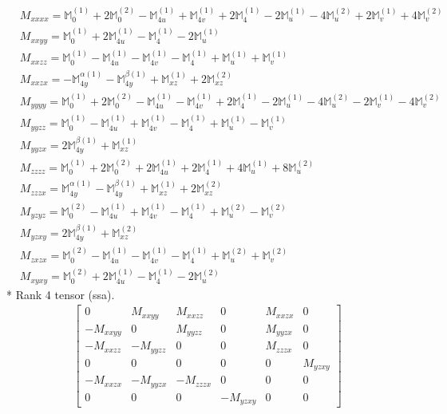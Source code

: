 \documentclass[fleqn,8pt,landscape]{jsarticle}
\begin{document}
\begin{align*}
& M_{xxxx} = \mathbb{M}_{0}^{(1)} + 2 \mathbb{M}_{0}^{(2)} - \mathbb{M}_{4u}^{(1)} + \mathbb{M}_{4v}^{(1)} + 2 \mathbb{M}_{4}^{(1)} - 2 \mathbb{M}_{u}^{(1)} - 4 \mathbb{M}_{u}^{(2)} + 2 \mathbb{M}_{v}^{(1)} + 4 \mathbb{M}_{v}^{(2)} \\
& M_{xxyy} = \mathbb{M}_{0}^{(1)} + 2 \mathbb{M}_{4u}^{(1)} - \mathbb{M}_{4}^{(1)} - 2 \mathbb{M}_{u}^{(1)} \\
& M_{xxzz} = \mathbb{M}_{0}^{(1)} - \mathbb{M}_{4u}^{(1)} - \mathbb{M}_{4v}^{(1)} - \mathbb{M}_{4}^{(1)} + \mathbb{M}_{u}^{(1)} + \mathbb{M}_{v}^{(1)} \\
& M_{xxzx} = - \mathbb{M}_{4y}^{\alpha(1)} - \mathbb{M}_{4y}^{\beta(1)} + \mathbb{M}_{xz}^{(1)} + 2 \mathbb{M}_{xz}^{(2)} \\
& M_{yyyy} = \mathbb{M}_{0}^{(1)} + 2 \mathbb{M}_{0}^{(2)} - \mathbb{M}_{4u}^{(1)} - \mathbb{M}_{4v}^{(1)} + 2 \mathbb{M}_{4}^{(1)} - 2 \mathbb{M}_{u}^{(1)} - 4 \mathbb{M}_{u}^{(2)} - 2 \mathbb{M}_{v}^{(1)} - 4 \mathbb{M}_{v}^{(2)} \\
& M_{yyzz} = \mathbb{M}_{0}^{(1)} - \mathbb{M}_{4u}^{(1)} + \mathbb{M}_{4v}^{(1)} - \mathbb{M}_{4}^{(1)} + \mathbb{M}_{u}^{(1)} - \mathbb{M}_{v}^{(1)} \\
& M_{yyzx} = 2 \mathbb{M}_{4y}^{\beta(1)} + \mathbb{M}_{xz}^{(1)} \\
& M_{zzzz} = \mathbb{M}_{0}^{(1)} + 2 \mathbb{M}_{0}^{(2)} + 2 \mathbb{M}_{4u}^{(1)} + 2 \mathbb{M}_{4}^{(1)} + 4 \mathbb{M}_{u}^{(1)} + 8 \mathbb{M}_{u}^{(2)} \\
& M_{zzzx} = \mathbb{M}_{4y}^{\alpha(1)} - \mathbb{M}_{4y}^{\beta(1)} + \mathbb{M}_{xz}^{(1)} + 2 \mathbb{M}_{xz}^{(2)} \\
& M_{yzyz} = \mathbb{M}_{0}^{(2)} - \mathbb{M}_{4u}^{(1)} + \mathbb{M}_{4v}^{(1)} - \mathbb{M}_{4}^{(1)} + \mathbb{M}_{u}^{(2)} - \mathbb{M}_{v}^{(2)} \\
& M_{yzxy} = 2 \mathbb{M}_{4y}^{\beta(1)} + \mathbb{M}_{xz}^{(2)} \\
& M_{zxzx} = \mathbb{M}_{0}^{(2)} - \mathbb{M}_{4u}^{(1)} - \mathbb{M}_{4v}^{(1)} - \mathbb{M}_{4}^{(1)} + \mathbb{M}_{u}^{(2)} + \mathbb{M}_{v}^{(2)} \\
& M_{xyxy} = \mathbb{M}_{0}^{(2)} + 2 \mathbb{M}_{4u}^{(1)} - \mathbb{M}_{4}^{(1)} - 2 \mathbb{M}_{u}^{(2)}
\end{align*}
* Rank 4 tensor (ssa).
\begin{align*}
\begin{bmatrix} 0 & M_{xxyy} & M_{xxzz} & 0 & M_{xxzx} & 0 \\ - M_{xxyy} & 0 & M_{yyzz} & 0 & M_{yyzx} & 0 \\ - M_{xxzz} & - M_{yyzz} & 0 & 0 & M_{zzzx} & 0 \\ 0 & 0 & 0 & 0 & 0 & M_{yzxy} \\ - M_{xxzx} & - M_{yyzx} & - M_{zzzx} & 0 & 0 & 0 \\ 0 & 0 & 0 & - M_{yzxy} & 0 & 0 \end{bmatrix}
\end{align*}
\end{document}

